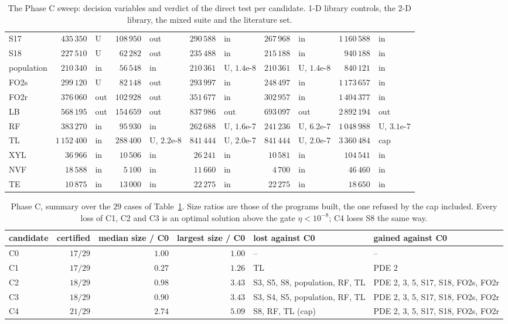 \begin{table}[h]
\begin{tabular}{lrlrlrlrlrl}
S17 & $435\,350$ & U & $108\,950$ & out & $290\,588$ & in & $267\,968$ & in & $1\,160\,588$ & in \\
S18 & $227\,510$ & U & $62\,282$ & out & $235\,488$ & in & $215\,188$ & in & $940\,188$ & in \\
\midrule
population & $210\,340$ & in & $56\,548$ & in & $210\,361$ & U, $1.4$e-8 & $210\,361$ & U, $1.4$e-8 & $840\,121$ & in \\
FO2s & $299\,120$ & U & $82\,148$ & out & $293\,997$ & in & $248\,497$ & in & $1\,173\,657$ & in \\
FO2r & $376\,060$ & out & $102\,928$ & out & $351\,677$ & in & $302\,957$ & in & $1\,404\,377$ & in \\
LB & $568\,195$ & out & $154\,659$ & out & $837\,986$ & out & $693\,097$ & out & $2\,892\,194$ & out \\
RF & $383\,270$ & in & $95\,930$ & in & $262\,688$ & U, $1.6$e-7 & $241\,236$ & U, $6.2$e-7 & $1\,048\,988$ & U, $3.1$e-7 \\
TL & $1\,152\,400$ & in & $288\,400$ & U, $2.2$e-8 & $841\,444$ & U, $2.0$e-7 & $841\,444$ & U, $2.0$e-7 & $3\,360\,484$ & cap \\
XYL & $36\,966$ & in & $10\,506$ & in & $26\,241$ & in & $10\,581$ & in & $104\,541$ & in \\
NVF & $18\,588$ & in & $5\,100$ & in & $11\,660$ & in & $4\,700$ & in & $46\,460$ & in \\
TE & $10\,875$ & in & $13\,000$ & in & $22\,275$ & in & $22\,275$ & in & $18\,650$ & in \\
\bottomrule
\end{tabular}
\caption{The Phase C sweep: decision variables and verdict of the direct test per candidate. 1-D library controls, the 2-D library, the mixed suite and the literature set.}\label{tab:phasec}
\end{table}

\begin{table}[h]\centering\scriptsize
\setlength{\tabcolsep}{4pt}
\begin{tabular}{lrrrp{3.4cm}p{4.0cm}}
\toprule
candidate & certified & median size / C0 & largest size / C0 & lost against C0 & gained against C0 \\
\midrule
C0 & $17/29$ & $1.00$ & $1.00$ & -- & -- \\
C1 & $17/29$ & $0.27$ & $1.26$ & TL & PDE 2 \\
C2 & $18/29$ & $0.98$ & $3.43$ & S3, S5, S8, population, RF, TL & PDE 2, 3, 5, S17, S18, FO2s, FO2r \\
C3 & $18/29$ & $0.90$ & $3.43$ & S3, S4, S5, population, RF, TL & PDE 2, 3, 5, S17, S18, FO2s, FO2r \\
C4 & $21/29$ & $2.74$ & $5.09$ & S8, RF, TL (cap) & PDE 2, 3, 5, S17, S18, FO2s, FO2r \\
\bottomrule
\end{tabular}
\caption{Phase C, summary over the $29$ cases of Table~\ref{tab:phasec}. Size ratios are those of the programs built, the one refused by the cap included. Every loss of C1, C2 and C3 is an optimal solution above the gate $\eta<10^{-8}$; C4 loses S8 the same way.}\label{tab:phasec-summ}
\end{table}

